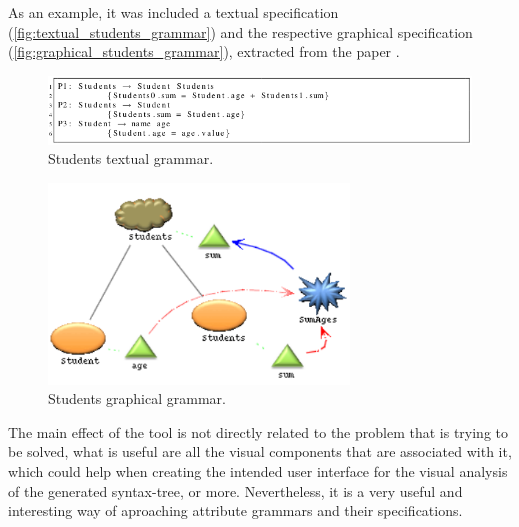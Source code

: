 As an example, it was included a textual specification (\autoref{fig:textual_students_grammar}) and the respective graphical specification (\autoref{fig:graphical_students_grammar}), extracted from the paper \cite{oliveira_2009}.
    
\begin{figure}[h]
    \centering
    \includegraphics[width=15cm]{images/textual_students_grammar.png}
    \caption{Students textual grammar.}
    \label{fig:textual_students_grammar}
\end{figure}

\newpage

\begin{figure}[h]
    \centering
    \includegraphics[width=8cm]{images/graphical_students_grammar.png}
    \caption{Students graphical grammar.}
    \label{fig:graphical_students_grammar}
\end{figure}

The main effect of the tool is not directly related to the problem that is trying to be solved, what is useful are all the visual components that are associated with it, which could help when creating the intended user interface for the visual analysis of the generated syntax-tree, or more. Nevertheless, it is a very useful and interesting way of aproaching attribute grammars and their specifications.
